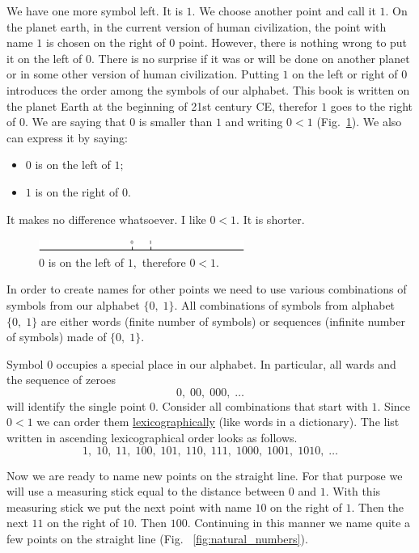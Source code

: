 \documentclass[color=black,11pt]{elegantpaper}
\begin{document}
We have one more symbol left. It is $1.$  We choose another point and call it $1.$  On the planet earth, in the current version of human civilization, the point with name $1$ is chosen on the right of $0$ point. However, there is nothing wrong to put it on the left of $0.$  There is no surprise if it was or will be done on another planet or in some other version of human civilization. Putting $1$ on the left or right of $0$ introduces the order among the symbols of our alphabet. This book is written on the planet Earth at the beginning of 21st century CE, therefor $1$ goes to the right of $0.$ We are saying that $0$ is smaller than $1$ and writing $0<1$ (Fig.~\ref{fig:zero_and_1}). We also can express it by saying: 
\begin{itemize}
\item $0$ is on the left of $1;$
\item $1$ is on the right of $0.$
\end{itemize}
It makes no difference whatsoever. I like  $0<1.$ It is shorter.
\begin{figure}[htbp]
  \centering
  \includegraphics[width=0.6\textwidth]{xfig_stuff/Line_with_0_and_1.eps}
  \caption{$0$ is on the left of $1,$ therefore $0<1.$}
  \label{fig:zero_and_1}
\end{figure}
In order to create names for other points we need to use various combinations of symbols from our alphabet $\{0,\;1\}.$ All combinations of symbols from alphabet $\{0,\;1\}$ are either words (finite number of symbols) or sequences (infinite number of symbols) made of $\{0,\;1\}.$

Symbol $0$ occupies a special place in our alphabet. In particular, all wards and the sequence of zeroes 
$$
0,\;00,\;000,\; \dots
$$
will identify the single point $0.$ Consider all combinations that start with $1.$ Since $0<1$ we can order them \href{https://en.wikipedia.org/wiki/Lexicographic_order}{lexicographically} (like words in a dictionary). The list written in ascending lexicographical order looks as follows.
$$
1,\;10,\;11,\;100,\;101,\;110,\;111,\;1000,\;1001,\;1010,\;\dots
$$ 

Now we are ready to name new points on the straight line. For that purpose we will use a measuring stick equal to the distance between $0$ and $1.$ With this measuring stick we put the next point with name $10$ on the right of $1$. Then the next $11$ on the right of $10$. Then $100.$ Continuing in this manner we name quite a few points on the straight line (Fig. ~\ref{fig:natural_numbers}). 
\end{document}
